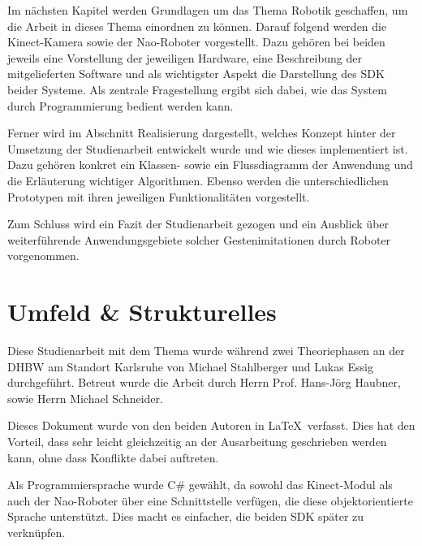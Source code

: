 Im nächsten Kapitel werden Grundlagen um das Thema Robotik geschaffen, um die Arbeit in dieses Thema einordnen zu können. Darauf folgend werden die Kinect-Kamera sowie der Nao-Roboter vorgestellt. Dazu gehören bei beiden jeweils eine Vorstellung der jeweiligen Hardware, eine Beschreibung der mitgelieferten Software und als wichtigster Aspekt die Darstellung des \ac{SDK} beider Systeme. Als zentrale Fragestellung ergibt sich dabei, wie das System durch Programmierung bedient werden kann.

Ferner wird im Abschnitt Realisierung dargestellt, welches Konzept hinter der Umsetzung der Studienarbeit entwickelt wurde und wie dieses implementiert ist. Dazu gehören konkret ein Klassen- sowie ein Flussdiagramm der Anwendung und die Erläuterung wichtiger Algorithmen. Ebenso werden die unterschiedlichen Prototypen mit ihren jeweiligen Funktionalitäten vorgestellt. 

Zum Schluss wird ein Fazit der Studienarbeit gezogen und ein Ausblick über weiterführende Anwendungsgebiete solcher Gestenimitationen durch Roboter vorgenommen.

\section{Umfeld \& Strukturelles}
Diese Studienarbeit mit dem Thema \textit{\Titel} wurde während zwei Theoriephasen an der \ac{DHBW} am Standort Karlsruhe von Michael Stahlberger und Lukas Essig durchgeführt. Betreut wurde die Arbeit durch Herrn Prof. Hans-Jörg Haubner, sowie Herrn Michael Schneider. 

Dieses Dokument wurde von den beiden Autoren in \LaTeX\ verfasst. Dies hat den Vorteil, dass sehr leicht gleichzeitig an der Ausarbeitung geschrieben werden kann, ohne dass Konflikte dabei auftreten. 

Als Programmiersprache wurde C\# gewählt, da sowohl das Kinect-Modul als auch der Nao-Roboter über eine Schnittstelle verfügen, die diese objektorientierte Sprache unterstützt. Dies macht es einfacher, die beiden \ac{SDK} später zu verknüpfen.


